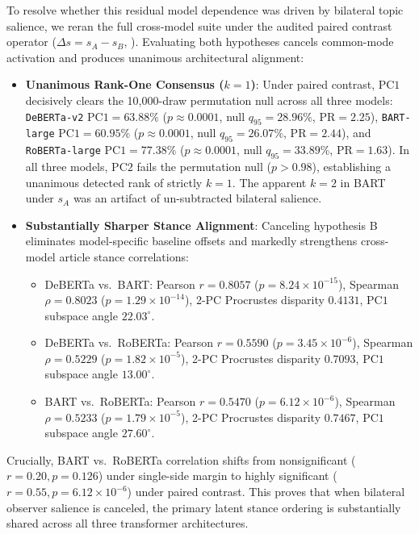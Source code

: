 To resolve whether this residual model dependence was driven by bilateral topic salience, we reran the full cross-model suite under the audited paired contrast operator ($\Delta s = s_A - s_B$, ). Evaluating both hypotheses cancels common-mode activation and produces unanimous architectural alignment:
\begin{itemize}
    \item \textbf{Unanimous Rank-One Consensus ($k=1$)}: Under paired contrast, $\mathrm{PC1}$ decisively clears the 10,000-draw permutation null across all three models: \texttt{DeBERTa-v2} $\mathrm{PC1} = 63.88\%$ ($p \approx 0.0001$, null $q_{95} = 28.96\%$, $\mathrm{PR} = 2.25$), \texttt{BART-large} $\mathrm{PC1} = 60.95\%$ ($p \approx 0.0001$, null $q_{95} = 26.07\%$, $\mathrm{PR} = 2.44$), and \texttt{RoBERTa-large} $\mathrm{PC1} = 77.38\%$ ($p \approx 0.0001$, null $q_{95} = 33.89\%$, $\mathrm{PR} = 1.63$). In all three models, $\mathrm{PC2}$ fails the permutation null ($p > 0.98$), establishing a unanimous detected rank of strictly $k = 1$. The apparent $k=2$ in BART under $s_A$ was an artifact of un-subtracted bilateral salience.
    \item \textbf{Substantially Sharper Stance Alignment}: Canceling hypothesis B eliminates model-specific baseline offsets and markedly strengthens cross-model article stance correlations:
    \begin{itemize}
        \item DeBERTa vs.\ BART: Pearson $r = 0.8057$ ($p = 8.24 \times 10^{-15}$), Spearman $\rho = 0.8023$ ($p = 1.29 \times 10^{-14}$), 2-PC Procrustes disparity $0.4131$, $\mathrm{PC1}$ subspace angle $22.03^\circ$.
        \item DeBERTa vs.\ RoBERTa: Pearson $r = 0.5590$ ($p = 3.45 \times 10^{-6}$), Spearman $\rho = 0.5229$ ($p = 1.82 \times 10^{-5}$), 2-PC Procrustes disparity $0.7093$, $\mathrm{PC1}$ subspace angle $13.00^\circ$.
        \item BART vs.\ RoBERTa: Pearson $r = 0.5470$ ($p = 6.12 \times 10^{-6}$), Spearman $\rho = 0.5233$ ($p = 1.79 \times 10^{-5}$), 2-PC Procrustes disparity $0.7467$, $\mathrm{PC1}$ subspace angle $27.60^\circ$.
    \end{itemize}
\end{itemize}
Crucially, BART vs.\ RoBERTa correlation shifts from nonsignificant ($r = 0.20, p = 0.126$) under single-side margin to highly significant ($r = 0.55, p = 6.12 \times 10^{-6}$) under paired contrast. This proves that when bilateral observer salience is canceled, the primary latent stance ordering is substantially shared across all three transformer architectures.

